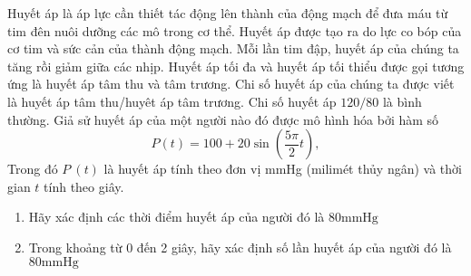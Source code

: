 \begin{bt}%
	Huyết áp là áp lực cần thiết tác động lên thành của động mạch để đưa máu từ tim đên nuôi dưỡng các mô trong cơ thể. Huyết áp được tạo ra do lực co bóp của cơ tim và sức cản của thành động mạch. Mỗi lần tim đập, huyết áp của chúng ta tăng rồi giảm giữa các nhịp. Huyết áp tối đa và huyết áp tối thiểu được gọi tương ứng là huyết áp tâm thu và tâm trương. Chi số huyết áp của chúng ta được viết là huyết áp tâm thu/huyêt áp tâm trương. Chi số huyết áp $120/80$ là bình thường. Giả sử huyết áp của một người nào đó được mô hình hóa bởi hàm số
	$$
	P(t)=100+20 \sin \left(\dfrac{5 \pi}{2} t\right),
	$$
	Trong đó $P\ (t)$ là huyết áp tính theo đơn vị mmHg (milimét thủy ngân) và thời gian $t$ tính theo giây.
	\begin{enumerate}
		\item  Hãy xác định các thời điểm huyết áp của người đó là $80 \mathrm{mmHg}$
		\item  Trong khoảng từ 0 đến 2 giây, hãy xác định số lần huyết áp của người đó là $80 \mathrm{mmHg}$
	\end{enumerate}
\end{bt}
